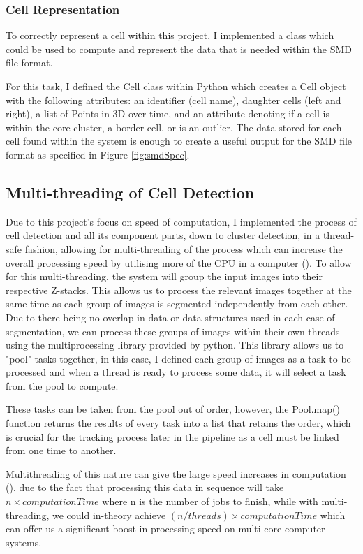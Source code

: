 \documentclass[12pt a4paper]{article}
\begin{document}
\subsubsection{Cell Representation}
To correctly represent a cell within this project, I implemented a class which could be used to compute and represent the data that is needed within the SMD file format.

For this task, I defined the Cell class within Python which creates a Cell object with the following attributes: an identifier (cell name), daughter cells (left and right), a list of Points in 3D over time, and an attribute denoting if a cell is within the core cluster, a border cell, or is an outlier. The data stored for each cell found within the system is enough to create a useful output for the SMD file format as specified in Figure \ref{fig:smdSpec}.


\subsection{Multi-threading of Cell Detection}
Due to this project's focus on speed of computation, I implemented the process of cell detection and all its component parts, down to cluster detection, in a thread-safe fashion, allowing for multi-threading of the process which can increase the overall processing speed by utilising more of the CPU in a computer (\cite{sodan2010parallelism}). 
To allow for this multi-threading, the system will group the input images into their respective Z-stacks. This allows us to process the relevant images together at the same time as each group of images is segmented independently from each other. Due to there being no overlap in data or data-structures used in each case of segmentation, we can process these groups of images within their own threads using the multiprocessing library provided by python. This library allows us to "pool" tasks together, in this case, I defined each group of images as a task to be processed and when a thread is ready to process some data, it will select a task from the pool to compute. 

These tasks can be taken from the pool out of order, however, the Pool.map() function returns the results of every task into a list that retains the order, which is crucial for the tracking process later in the pipeline as a cell must be linked from one time to another.

Multithreading of this nature can give the large speed increases in computation (\cite{sodan2010parallelism}), due to the fact that processing this data in sequence will take $n \times computationTime$ where n is the number of jobs to finish, while with multi-threading, we could in-theory achieve $(n/ threads) \times computationTime$ which can offer us a significant boost in processing speed on multi-core computer systems. 
\end{document}
